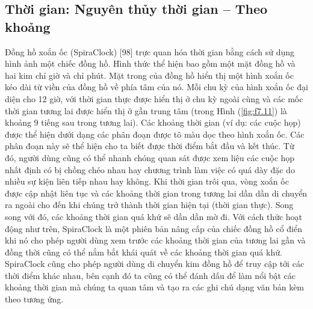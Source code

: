 \subsection{Thời gian: Nguyên thủy thời gian – Theo khoảng}
Đồng hồ xoắn ốc (SpiraClock) [98] trực quan hóa thời gian bằng cách sử dụng hình ảnh một chiếc đồng hồ. Hình thức thể hiện bao gồm một mặt đồng hồ và hai kim chỉ giờ và chỉ phút. Mặt trong của đồng hồ hiển thị một hình xoắn ốc kéo dài từ viền của đồng hồ về phía tâm của nó. Mỗi chu kỳ của hình xoắn ốc đại diện cho 12 giờ, với thời gian thực được hiển thị ở chu kỳ ngoài cùng và các mốc thời gian tương lai được hiển thị ở gần trung tâm (trong Hình (\ref{fig:f7.11}) là khoảng 9 tiếng sau trong tương lai). Các khoảng thời gian (ví dụ: các cuộc họp) được thể hiện dưới dạng các phân đoạn được tô màu dọc theo hình xoắn ốc. Các phân đoạn này sẽ thể hiện cho ta biết được thời điểm bắt đầu và kết thúc. Từ đó, người dùng cũng có thể nhanh chóng quan sát được xem liệu các cuộc họp nhất định có bị chồng chéo nhau hay chương trình làm việc có quá dày đặc do nhiều sự kiện liên tiếp nhau hay không. Khi thời gian trôi qua, vòng xoắn ốc được cập nhật liên tục và các khoảng thời gian trong tương lai dần dần di chuyển ra ngoài cho đến khi chúng trở thành thời gian hiện tại (thời gian thực). Song song với đó, các khoảng thời gian quá khứ sẽ dần dần mờ đi. Với cách thức hoạt động như trên, SpiraClock là một phiên bản nâng cấp của chiếc đồng hồ cổ điển khi nó cho phép người dùng xem trước các khoảng thời gian của tương lai gần và đồng thời cũng có thể nắm bắt khái quát về các khoảng thời gian quá khứ. SpiraClock cũng cho phép người dùng di chuyển kim đồng hồ để truy cập tới các thời điểm khác nhau, bên cạnh đó ta cũng có thể đánh dấu để làm nổi bật các khoảng thời gian mà chúng ta quan tâm và tạo ra các ghi chú dạng văn bản kèm theo tương ứng.
